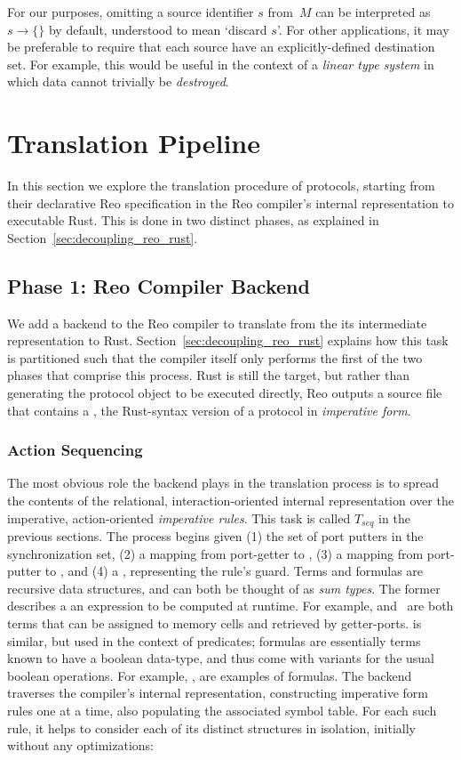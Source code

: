 For our purposes, omitting a source identifier $s$ from~$M$ can be interpreted as $s\rightarrow{}\{\}$ by default, understood to mean `discard $s$'. For other applications, it may be preferable to require that each source have an explicitly-defined destination set. For example, this would be useful in the context of a \textit{linear type system} in which data cannot trivially be \textit{destroyed}. 



\section{Translation Pipeline}
In this section we explore the translation procedure of protocols, starting from their declarative Reo specification in the Reo compiler's internal representation to executable Rust. This is done in two distinct phases, as explained in Section~\ref{sec:decoupling_reo_rust}. 

\subsection{Phase 1: Reo Compiler Backend}
\label{sec:translation_phase_1}
We add a backend to the Reo compiler to translate from the its intermediate representation to Rust. Section~\ref{sec:decoupling_reo_rust} explains how this task is partitioned such that the compiler itself only performs the first of the two phases that comprise this process. Rust is still the target, but rather than generating the protocol object to be executed directly, Reo outputs a source file that contains a , the Rust-syntax version of a protocol in \textit{imperative form}. 


\subsubsection{Action Sequencing}
The most obvious role the backend plays in the translation process is to spread the contents of the relational, interaction-oriented internal representation over the imperative, action-oriented \textit{imperative rules}. This task is called $T_{seq}$ in the previous sections. The process begins given (1) the set of port putters in the synchronization set, (2) a mapping from port-getter to , (3) a mapping from port-putter to , and (4) a , representing the rule's guard. Terms and formulas are recursive data structures, and can both be thought of as \textit{sum types}. The former describes a an expression to be computed at runtime. For example,  and~ are both terms that can be assigned to memory cells and retrieved by getter-ports.  is similar, but used in the context of predicates; formulas are essentially terms known to have a boolean data-type, and thus come with variants for the usual boolean operations. For example, ,  are examples of formulas. The backend traverses the compiler's internal representation, constructing imperative form rules one at a time, also populating the associated  symbol table. For each such rule, it helps to consider each of its distinct structures in isolation, initially without any optimizations:

